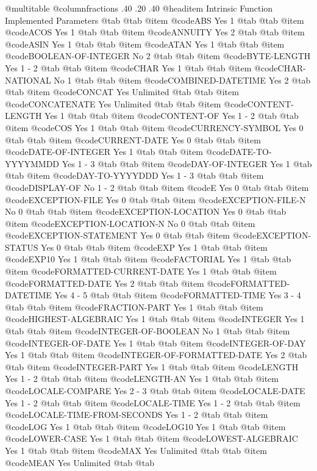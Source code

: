 @multitable @columnfractions .40 .20 .40
@headitem Intrinsic Function	Implemented	Parameters @tab  @tab 
@item @code{ABS	Yes	1} @tab  @tab 
@item @code{ACOS	Yes	1} @tab  @tab 
@item @code{ANNUITY	Yes	2} @tab  @tab 
@item @code{ASIN	Yes	1} @tab  @tab 
@item @code{ATAN	Yes	1} @tab  @tab 
@item @code{BOOLEAN-OF-INTEGER	No	2} @tab  @tab 
@item @code{BYTE-LENGTH	Yes	1 - 2} @tab  @tab 
@item @code{CHAR	Yes	1} @tab  @tab 
@item @code{CHAR-NATIONAL	No	1} @tab  @tab 
@item @code{COMBINED-DATETIME	Yes	2} @tab  @tab 
@item @code{CONCAT	Yes	Unlimited} @tab  @tab 
@item @code{CONCATENATE	Yes	Unlimited} @tab  @tab 
@item @code{CONTENT-LENGTH	Yes	1} @tab  @tab 
@item @code{CONTENT-OF	Yes	1 - 2} @tab  @tab 
@item @code{COS	Yes	1} @tab  @tab 
@item @code{CURRENCY-SYMBOL	Yes	0} @tab  @tab 
@item @code{CURRENT-DATE	Yes	0} @tab  @tab 
@item @code{DATE-OF-INTEGER	Yes	1} @tab  @tab 
@item @code{DATE-TO-YYYYMMDD	Yes	1 - 3} @tab  @tab 
@item @code{DAY-OF-INTEGER	Yes	1} @tab  @tab 
@item @code{DAY-TO-YYYYDDD	Yes	1 - 3} @tab  @tab 
@item @code{DISPLAY-OF	No	1 - 2} @tab  @tab 
@item @code{E	Yes	0} @tab  @tab 
@item @code{EXCEPTION-FILE	Yes	0} @tab  @tab 
@item @code{EXCEPTION-FILE-N	No	0} @tab  @tab 
@item @code{EXCEPTION-LOCATION	Yes	0} @tab  @tab 
@item @code{EXCEPTION-LOCATION-N	No	0} @tab  @tab 
@item @code{EXCEPTION-STATEMENT	Yes	0} @tab  @tab 
@item @code{EXCEPTION-STATUS	Yes	0} @tab  @tab 
@item @code{EXP	Yes	1} @tab  @tab 
@item @code{EXP10	Yes	1} @tab  @tab 
@item @code{FACTORIAL	Yes	1} @tab  @tab 
@item @code{FORMATTED-CURRENT-DATE	Yes	1} @tab  @tab 
@item @code{FORMATTED-DATE	Yes	2} @tab  @tab 
@item @code{FORMATTED-DATETIME	Yes	4 - 5} @tab  @tab 
@item @code{FORMATTED-TIME	Yes	3 - 4} @tab  @tab 
@item @code{FRACTION-PART	Yes	1} @tab  @tab 
@item @code{HIGHEST-ALGEBRAIC	Yes	1} @tab  @tab 
@item @code{INTEGER	Yes	1} @tab  @tab 
@item @code{INTEGER-OF-BOOLEAN	No	1} @tab  @tab 
@item @code{INTEGER-OF-DATE	Yes	1} @tab  @tab 
@item @code{INTEGER-OF-DAY	Yes	1} @tab  @tab 
@item @code{INTEGER-OF-FORMATTED-DATE	Yes	2} @tab  @tab 
@item @code{INTEGER-PART	Yes	1} @tab  @tab 
@item @code{LENGTH	Yes	1 - 2} @tab  @tab 
@item @code{LENGTH-AN	Yes	1} @tab  @tab 
@item @code{LOCALE-COMPARE	Yes	2 - 3} @tab  @tab 
@item @code{LOCALE-DATE	Yes	1 - 2} @tab  @tab 
@item @code{LOCALE-TIME	Yes	1 - 2} @tab  @tab 
@item @code{LOCALE-TIME-FROM-SECONDS	Yes	1 - 2} @tab  @tab 
@item @code{LOG	Yes	1} @tab  @tab 
@item @code{LOG10	Yes	1} @tab  @tab 
@item @code{LOWER-CASE	Yes	1} @tab  @tab 
@item @code{LOWEST-ALGEBRAIC	Yes	1} @tab  @tab 
@item @code{MAX	Yes	Unlimited} @tab  @tab 
@item @code{MEAN	Yes	Unlimited} @tab  @tab 
